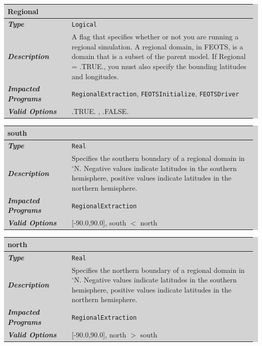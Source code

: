 \documentclass{softwaremanual}
\begin{document}

\noindent\begingroup\setlength{\fboxsep}{0pt}
\colorbox{lightgray}{
\begin{tabular}{p{0.25\linewidth} p{0.725\linewidth}}
\toprule
\textbf{Regional} & \\
\midrule
\textbf{\textit{Type}} & \texttt{Logical} \\
\midrule
\textbf{\textit{Description}} & A flag that specifies whether or not you are running a regional simulation. A regional domain, in FEOTS, is a domain that is a subset of the parent model. If Regional = .TRUE., you must also specify the bounding latitudes and longitudes. \\
\midrule
\textbf{\textit{Impacted Programs}} & \texttt{RegionalExtraction}, \texttt{FEOTSInitialize}, \texttt{FEOTSDriver} \\
\midrule
\textbf{\textit{Valid Options}}  & .TRUE. , .FALSE. \\
\bottomrule
\end{tabular}
}\endgroup


\noindent\begingroup\setlength{\fboxsep}{0pt}
\colorbox{lightgray}{
\begin{tabular}{p{0.25\linewidth} p{0.725\linewidth}}
\toprule
\textbf{south} & \\
\midrule
\textbf{\textit{Type}} & \texttt{Real} \\
\midrule
\textbf{\textit{Description}} & Specifies the southern boundary of a regional domain in $^\circ$N. Negative values indicate latitudes in the southern hemisphere, positive values indicate latitudes in the northern hemisphere. \\
\midrule
\textbf{\textit{Impacted Programs}} & \texttt{RegionalExtraction} \\
\midrule
\textbf{\textit{Valid Options}}  & [-90.0,90.0], south $<$ north \\
\bottomrule
\end{tabular}
}\endgroup


\noindent\begingroup\setlength{\fboxsep}{0pt}
\colorbox{lightgray}{
\begin{tabular}{p{0.25\linewidth} p{0.725\linewidth}}
\toprule
\textbf{north} & \\
\midrule
\textbf{\textit{Type}} & \texttt{Real} \\
\midrule
\textbf{\textit{Description}} & Specifies the northern boundary of a regional domain in $^\circ$N. Negative values indicate latitudes in the southern hemisphere, positive values indicate latitudes in the northern hemisphere. \\
\midrule
\textbf{\textit{Impacted Programs}} & \texttt{RegionalExtraction} \\
\midrule
\textbf{\textit{Valid Options}}  & [-90.0,90.0], north $>$ south \\
\bottomrule
\end{tabular}
}\endgroup
\end{document}
